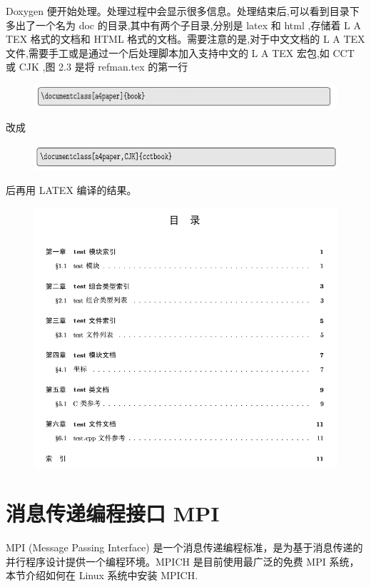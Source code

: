\documentclass[12pt,a4paper]{article}
\begin{document}
Doxygen 便开始处理。处理过程中会显示很多信息。处理结束后,可以看到目录下多出了一个名为 doc 的目录,其中有两个子目录,分别是 latex 和 html ,存储着 L A TEX 格式的文档和 HTML 格式的文档。需要注意的是,对于中文文档的 L A TEX 文件,需要手工或是通过一个后处理脚本加入支持中文的 L A TEX 宏包,如 CCT 或 CJK ,图 2.3 是将 refman.tex 的第一行
\begin{figure}[H]
\centering
\includegraphics[scale=0.5]{./figures/21.png}
\caption{}
\end{figure}
改成
\begin{figure}[H]
\centering
\includegraphics[scale=0.5]{./figures/22.png}
\caption{}
\end{figure}
后再用 LATEX 编译的结果。
\begin{figure}[H]
\centering
\includegraphics[scale=0.5]{./figures/23.png}
\caption{}
\end{figure}

\section{ 消息传递编程接口 MPI }
MPI (Message Passing Interface) 是一个消息传递编程标准，是为基于消息传递的并行程序设计提供一个编程环境。MPICH 是目前使用最广泛的免费 MPI 系统，本节介绍如何在 Linux 系统中安装 MPICH.
\end{document}
